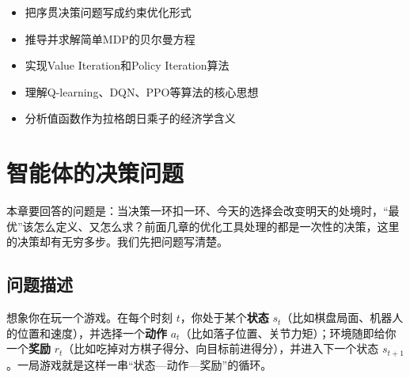 \begin{tcolorbox}[colback=green!5, colframe=green!60!black, title=学完这章，你将能够...]
\begin{itemize}
    \item 把序贯决策问题写成约束优化形式
    \item 推导并求解简单MDP的贝尔曼方程
    \item 实现Value Iteration和Policy Iteration算法
    \item 理解Q-learning、DQN、PPO等算法的核心思想
    \item 分析值函数作为拉格朗日乘子的经济学含义
\end{itemize}
\end{tcolorbox}

\section{智能体的决策问题}

本章要回答的问题是：当决策一环扣一环、今天的选择会改变明天的处境时，“最优”该怎么定义、又怎么求？前面几章的优化工具处理的都是一次性的决策，这里的决策却有无穷多步。我们先把问题写清楚。

\subsection{问题描述}

想象你在玩一个游戏。在每个时刻 $t$，你处于某个\textbf{状态} $s_t$（比如棋盘局面、机器人的位置和速度），并选择一个\textbf{动作} $a_t$（比如落子位置、关节力矩）；环境随即给你一个\textbf{奖励} $r_t$（比如吃掉对方棋子得分、向目标前进得分），并进入下一个状态 $s_{t+1}$。一局游戏就是这样一串“状态—动作—奖励”的循环。


